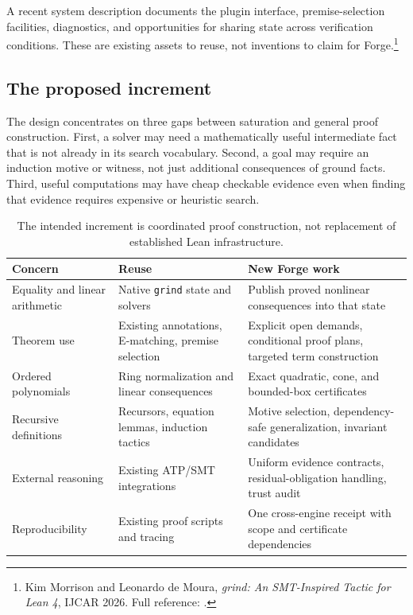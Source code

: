 \documentclass[11pt,letterpaper]{article}
\newcommand{\Lean}{\textsf{Lean}}
\newcommand{\Forge}{\textsf{Forge}}
\newcommand{\grind}{\texttt{grind}}
\newcommand{\src}[2]{\footnote{#2. Full reference: \cite{#1}.}}
\theoremstyle{definition}
\theoremstyle{remark}
\begin{document}
A recent system description documents the plugin interface, premise-selection facilities, diagnostics, and opportunities for sharing state across verification conditions. These are existing assets to reuse, not inventions to claim for \Forge{}.\src{grindpaper}{Kim Morrison and Leonardo de Moura, \emph{grind: An SMT-Inspired Tactic for Lean 4}, IJCAR 2026}

\subsection{The proposed increment}
The design concentrates on three gaps between saturation and general proof construction. First, a solver may need a mathematically useful intermediate fact that is not already in its search vocabulary. Second, a goal may require an induction motive or witness, not just additional consequences of ground facts. Third, useful computations may have cheap checkable evidence even when finding that evidence requires expensive or heuristic search.

\begin{table}[htbp]
\centering\small
\begin{tabularx}{\textwidth}{@{}p{}YY@{}}
\toprule
Concern & Reuse & New \Forge{} work \\
\midrule
Equality and linear arithmetic & Native \grind{} state and solvers & Publish proved nonlinear consequences into that state \\
Theorem use & Existing annotations, E-matching, premise selection & Explicit open demands, conditional proof plans, targeted term construction \\
Ordered polynomials & Ring normalization and linear consequences & Exact quadratic, cone, and bounded-box certificates \\
Recursive definitions & Recursors, equation lemmas, induction tactics & Motive selection, dependency-safe generalization, invariant candidates \\
External reasoning & Existing ATP/SMT integrations & Uniform evidence contracts, residual-obligation handling, trust audit \\
Reproducibility & Existing proof scripts and tracing & One cross-engine receipt with scope and certificate dependencies \\
\bottomrule
\end{tabularx}
\caption{The intended increment is coordinated proof construction, not replacement of established \Lean{} infrastructure.}
\end{table}
\end{document}
